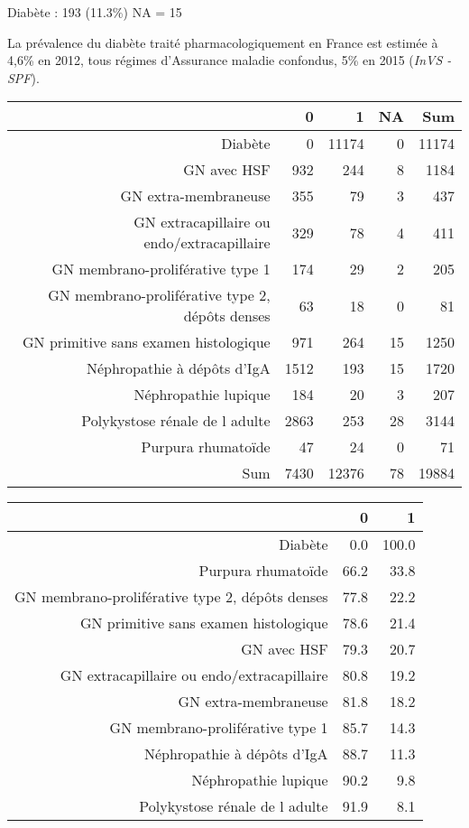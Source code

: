 \documentclass[11pt,a4paper]{article}\usepackage[]{graphicx}\usepackage[]{color}
\begin{document}
Diabète : 193 (11.3\%) NA = 15

La prévalence du diabète traité pharmacologiquement en France est estimée à 4,6\% en 2012, tous régimes d’Assurance maladie confondus, 5\% en 2015 (\textit{InVS - SPF}).

\begin{table}[ht]
\centering
\begin{tabular}{rrrrr}
  \hline
 & 0 & 1 & NA & Sum \\ 
  \hline
Diabète & 0 & 11174 & 0 & 11174 \\ 
  GN avec HSF & 932 & 244 & 8 & 1184 \\ 
  GN extra-membraneuse & 355 & 79 & 3 & 437 \\ 
  GN extracapillaire ou endo/extracapillaire & 329 & 78 & 4 & 411 \\ 
  GN membrano-proliférative type 1 & 174 & 29 & 2 & 205 \\ 
  GN membrano-proliférative type 2, dépôts denses & 63 & 18 & 0 & 81 \\ 
  GN primitive sans examen histologique & 971 & 264 & 15 & 1250 \\ 
  Néphropathie à dépôts d'IgA & 1512 & 193 & 15 & 1720 \\ 
  Néphropathie lupique & 184 & 20 & 3 & 207 \\ 
  Polykystose rénale de l adulte & 2863 & 253 & 28 & 3144 \\ 
  Purpura rhumatoïde & 47 & 24 & 0 & 71 \\ 
  Sum & 7430 & 12376 & 78 & 19884 \\ 
   \hline
\end{tabular}
\end{table}
\begin{table}[H]
\centering
\begin{tabular}{rrr}
  \hline
 & 0 & 1 \\ 
  \hline
Diabète & 0.0 & 100.0 \\ 
  Purpura rhumatoïde & 66.2 & 33.8 \\ 
  GN membrano-proliférative type 2, dépôts denses & 77.8 & 22.2 \\ 
  GN primitive sans examen histologique & 78.6 & 21.4 \\ 
  GN avec HSF & 79.3 & 20.7 \\ 
  GN extracapillaire ou endo/extracapillaire & 80.8 & 19.2 \\ 
  GN extra-membraneuse & 81.8 & 18.2 \\ 
  GN membrano-proliférative type 1 & 85.7 & 14.3 \\ 
  Néphropathie à dépôts d'IgA & 88.7 & 11.3 \\ 
  Néphropathie lupique & 90.2 & 9.8 \\ 
  Polykystose rénale de l adulte & 91.9 & 8.1 \\ 
   \hline
\end{tabular}
\end{table}
\end{document}
